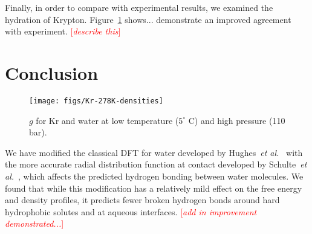 \documentclass[preprint,amsmath,amssymb]{revtex4-1}
\newcommand{\fixme}[1]{\textcolor{red}{[\emph{#1}]}}
\begin{document}
Finally, in order to compare with experimental results, we examined
the hydration of Krypton.  Figure~\ref{fig:g-Kr} shows... demonstrate
an improved agreement with experiment.  \fixme{describe this}





\section{Conclusion}

\begin{figure}
\begin{center}
\texttt{[image: figs/Kr-278K-densities]}
\end{center}
\caption{ $g$ for Kr and water at low temperature ($5^\circ$ C) and high
  pressure (110 bar).}
\label{fig:g-Kr}
\end{figure}

We have modified the classical DFT for water developed by
Hughes~\emph{et al.}~\cite{hughes2013classical} with the more accurate
radial distribution function at contact developed by Schulte~\emph{et
  al.}~\cite{schulte2012using}, which affects the predicted hydrogen
bonding between water molecules.  We found that while this
modification has a relatively mild effect on the free energy and
density profiles, it predicts fewer broken hydrogen bonds around
hard hydrophobic solutes and at aqueous interfaces.  \fixme{add in
  improvement demonstrated...}

\end{document}
